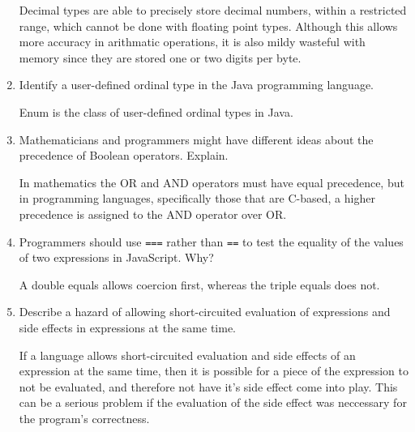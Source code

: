 \begin{enumerate}
  \begin{answer}

    Decimal types are able to precisely store decimal numbers, within a restricted range, which cannot be done with floating point types. Although this allows more accuracy in arithmatic operations, it is also mildy wasteful with memory since they are stored one or two digits per byte. 

    \end{answer}

  \item Identify a user-defined ordinal type in the Java programming
    language.

  \begin{answer}

    Enum is the class of user-defined ordinal types in Java.

    \end{answer}

  \item Mathematicians and programmers might have different ideas
    about the precedence of Boolean operators. Explain.

  \begin{answer}

    In mathematics the OR and AND operators must have equal precedence, but in programming languages, specifically those that are C-based, a higher precedence is assigned to the AND operator over OR.

    \end{answer}

  \item Programmers should use \verb+===+ rather than \verb+==+ to
    test the equality of the values of two expressions in JavaScript. Why?

  \begin{answer}

    A double equals allows coercion first, whereas the triple equals does not.

    \end{answer}

  \item Describe a hazard of allowing short-circuited evaluation
    of expressions and side effects in expressions at the same time.

  \begin{answer}

    If a language allows short-circuited evaluation and side effects of an expression at the same time, then it is possible for a piece of the expression to not be evaluated, and therefore not have it's side effect come into play. This can be a serious problem if the evaluation of the side effect was neccessary for the program's correctness.


\end{answer}
\end{enumerate}
